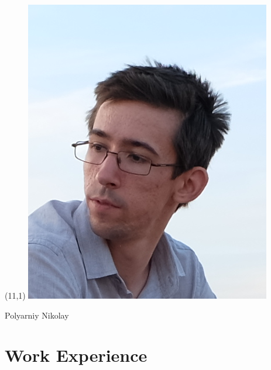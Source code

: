 \documentclass[11pt,oneside]{article}
\begin{document}
\begin{textblock}{7}(11,1)
    \includegraphics[scale=0.4]{photo.png}
\end{textblock}

\begin{center}
	{\huge Polyarniy Nikolay}
\end{center}

\vspace{-9pt}
\section*{\textbf{Work Experience}}
\vspace{-9pt}
\end{document}

